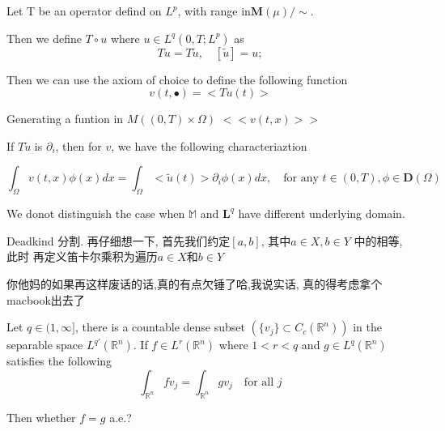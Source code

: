 \documentclass{beamer}
\newcommand{\p}{\partial}
\begin{document}
\begin{frame}
  
Let T be an operator defind on $L^p$, with range in$\mathbf{M}(\mu)/\sim$.
  
Then we define $T\circ u$ where $u\in L^q(0,T;L^p)$ as 
\begin{equation*}
  Tu=T\tilde{u}, \quad [\tilde{u}]=u;
\end{equation*}

Then we can use the axiom of choice to define the following function
\begin{equation*}
  v(t,\bullet)=<Tu(t)>
\end{equation*}

Generating a funtion in $M((0,T)\times\Omega)$  $<<v(t,x)>>$

If $T\tilde{u}$ is $\p_i$, then for $v$, we have the following characteriaztion
{\small

\begin{equation*}
  \int_{\Omega}v(t,x)\phi(x)dx=\int_{\Omega}<\tilde{u}(t)>\p_i\phi(x)dx,\quad \text{for any $t\in (0,T), \phi \in \mathbf{D}(\Omega)$}
\end{equation*}
}

We donot distinguish the case when $\mathbb{M}$ and 
$\mathbf{L}^q$ have different underlying domain.


\end{frame}

\begin{frame}
  Deadkind 分割. 再仔细想一下,  首先我们约定$[a,b]$, 其中$a\in X, b\in Y$ 中的相等, 此时
  再定义笛卡尔乘积为遍历$a\in X$和$b\in Y$

你他妈的如果再这样废话的话,真的有点欠锤了哈,我说实话,  真的得考虑拿个macbook出去了




\end{frame}

\begin{frame}
  
Let $q\in (1,\infty]$, there is a 
countable dense subset $( \{v_j\} \subset C_c(\mathbb{R}^n) )$
in the separable space $L^{q'} (\mathbb{R}^n)$. If $f\in L^r(\mathbb{R}^n)$ where
$1< r < q$
and $g\in L^q(\mathbb{R}^n)$ satisfies the following
\begin{equation*}
  \int_{\mathbb{R}^n}f v_j = \int_{\mathbb{R}^n}g v_j \quad \text{for all $j$}
\end{equation*}

Then whether $f=g$ a.e.?

\end{frame}
\end{document}

